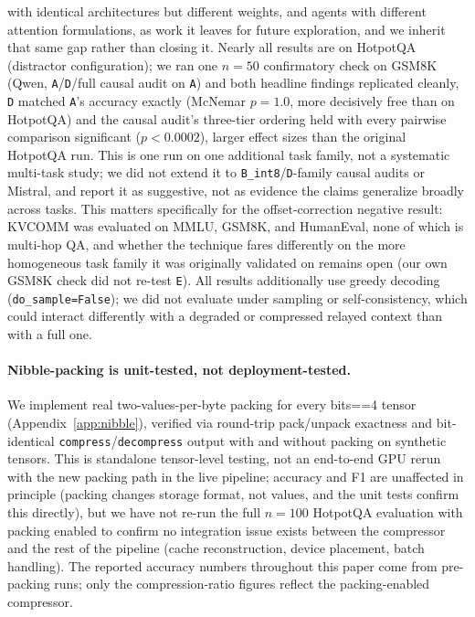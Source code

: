 \documentclass[11pt]{article}
\begin{document}
with identical architectures but different weights, and agents with
different attention formulations, as work it leaves for future
exploration, and we inherit that same gap rather than closing it. Nearly
all results are on HotpotQA (distractor configuration); we ran one
$n=50$ confirmatory check on GSM8K (Qwen, \texttt{A}/\texttt{D}/full
causal audit on \texttt{A}) and both headline findings replicated
cleanly, \texttt{D} matched \texttt{A}'s accuracy exactly (McNemar
$p=1.0$, more decisively free than on HotpotQA) and the causal audit's
three-tier ordering held with every pairwise comparison significant
($p<0.0002$), larger effect sizes than the original HotpotQA run. This is
one run on one additional task family, not a systematic multi-task
study; we did not extend it to \texttt{B\_int8}/\texttt{D}-family causal
audits or Mistral, and report it as suggestive, not as evidence the
claims generalize broadly across tasks. This matters specifically for the
offset-correction negative result: KVCOMM was evaluated on MMLU, GSM8K,
and HumanEval, none of which is multi-hop QA, and whether the technique
fares differently on the more homogeneous task family it was originally
validated on remains open (our own GSM8K check did not re-test
\texttt{E}). All results additionally use greedy decoding
(\texttt{do\_sample=False}); we did not evaluate under sampling or
self-consistency, which could interact differently with a degraded or
compressed relayed context than with a full one.

\paragraph{Nibble-packing is unit-tested, not deployment-tested.} We
implement real two-values-per-byte packing for every bits==4 tensor
(Appendix~\ref{app:nibble}), verified via round-trip pack/unpack
exactness and bit-identical \texttt{compress}/\texttt{decompress} output
with and without packing on synthetic tensors. This is standalone
tensor-level testing, not an end-to-end GPU rerun with the new packing
path in the live pipeline; accuracy and F1 are unaffected in principle
(packing changes storage format, not values, and the unit tests confirm
this directly), but we have not re-run the full $n=100$ HotpotQA
evaluation with packing enabled to confirm no integration issue exists
between the compressor and the rest of the pipeline (cache
reconstruction, device placement, batch handling). The reported accuracy
numbers throughout this paper come from pre-packing runs; only the
compression-ratio figures reflect the packing-enabled compressor.
\end{document}
